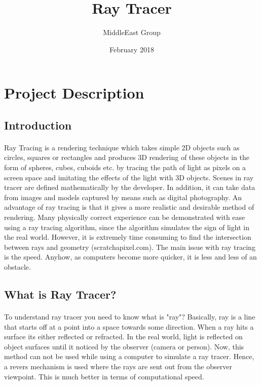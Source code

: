 \documentclass{article}
\title{Ray Tracer}
\author{MiddleEast Group }
\date{February 2018}
\begin{document}
\maketitle 



\section{Project Description}

\subsection{Introduction}
\paragraph{}
Ray Tracing is a rendering technique which takes simple 2D objects such as circles, squares or rectangles and
produces 3D rendering of these objects in the form of spheres, cubes, cuboids etc.  by tracing the path of light as pixels on a screen space and imitating the effects of the light  with 3D objects. Scenes in ray tracer are defined mathematically by the developer. In addition, it can take data from images and models captured by means such as digital photography. \newline An advantage of ray tracing is that it gives a more realistic and desirable method of rendering. Many physically correct experience can be demonstrated with ease using a ray tracing algorithm, since the algorithm simulates the sign of light in the real world.
However, it is extremely time consuming to find the intersection between rays and geometry (scratchapixel.com). The main issue with ray tracing is the speed. Anyhow, as computers become more quicker, it is less and less of an obstacle. 

\subsection{What is Ray Tracer?}

\paragraph{}
To understand ray tracer you need to know what is "ray"? Basically, ray is a line that starts off at a point into a space towards some direction. When a ray hits a surface its either reflected or refracted.
In the real world, light is reflected on object surfaces until it noticed by the observer (camera or person). \newline Now, this method can not be used while using a computer to simulate a ray tracer. Hence, a revers mechanism is used where the rays are sent out from the observer viewpoint. This is much better in terms of computational speed. 
\end{document}
